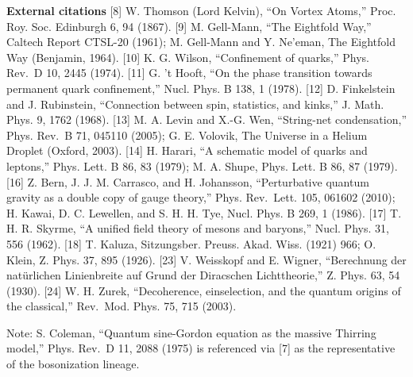 \documentclass[
]{article}
\begin{document}
\textbf{External citations} {[}8{]} W. Thomson (Lord Kelvin), ``On
Vortex Atoms,'' Proc. Roy. Soc. Edinburgh 6, 94 (1867). {[}9{]} M.
Gell-Mann, ``The Eightfold Way,'' Caltech Report CTSL-20 (1961); M.
Gell-Mann and Y. Ne'eman, The Eightfold Way (Benjamin, 1964). {[}10{]}
K. G. Wilson, ``Confinement of quarks,'' Phys. Rev.~D 10, 2445 (1974).
{[}11{]} G. 't Hooft, ``On the phase transition towards permanent quark
confinement,'' Nucl. Phys. B 138, 1 (1978). {[}12{]} D. Finkelstein and
J. Rubinstein, ``Connection between spin, statistics, and kinks,'' J.
Math. Phys. 9, 1762 (1968). {[}13{]} M. A. Levin and X.-G. Wen,
``String-net condensation,'' Phys. Rev.~B 71, 045110 (2005); G. E.
Volovik, The Universe in a Helium Droplet (Oxford, 2003). {[}14{]} H.
Harari, ``A schematic model of quarks and leptons,'' Phys. Lett. B 86,
83 (1979); M. A. Shupe, Phys. Lett. B 86, 87 (1979). {[}16{]} Z. Bern,
J. J. M. Carrasco, and H. Johansson, ``Perturbative quantum gravity as a
double copy of gauge theory,'' Phys. Rev.~Lett. 105, 061602 (2010); H.
Kawai, D. C. Lewellen, and S. H. H. Tye, Nucl. Phys. B 269, 1 (1986).
{[}17{]} T. H. R. Skyrme, ``A unified field theory of mesons and
baryons,'' Nucl. Phys. 31, 556 (1962). {[}18{]} T. Kaluza, Sitzungsber.
Preuss. Akad. Wiss. (1921) 966; O. Klein, Z. Phys. 37, 895 (1926).
{[}23{]} V. Weisskopf and E. Wigner, ``Berechnung der natürlichen
Linienbreite auf Grund der Diracschen Lichttheorie,'' Z. Phys. 63, 54
(1930). {[}24{]} W. H. Zurek, ``Decoherence, einselection, and the
quantum origins of the classical,'' Rev.~Mod. Phys. 75, 715 (2003).

Note: S. Coleman, ``Quantum sine-Gordon equation as the massive Thirring
model,'' Phys. Rev.~D 11, 2088 (1975) is referenced via {[}7{]} as the
representative of the bosonization lineage.
\end{document}
